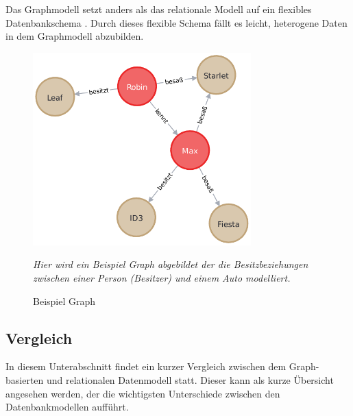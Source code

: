 Das Graphmodell setzt anders als das relationale Modell auf ein flexibles Datenbankschema \cite{gdbms}. Durch dieses flexible Schema fällt es leicht, heterogene Daten in dem Graphmodell abzubilden. 

\begin{figure}[ht]
    \centering
    \includegraphics[width=0.75\textwidth]{images/example_graph.pdf}
    \caption{Beispiel Graph}
    \vspace{1em}
    \textit{Hier wird ein Beispiel Graph abgebildet der die Besitzbeziehungen zwischen einer Person (Besitzer) und einem Auto modelliert.}
    \label{fig:beispiel_graph}
\end{figure}

\subsection{Vergleich}
In diesem Unterabschnitt findet ein kurzer Vergleich zwischen dem Graph-basierten und relationalen Datenmodell statt. Dieser kann als kurze Übersicht angesehen werden, der die wichtigsten Unterschiede zwischen den Datenbankmodellen aufführt. 


